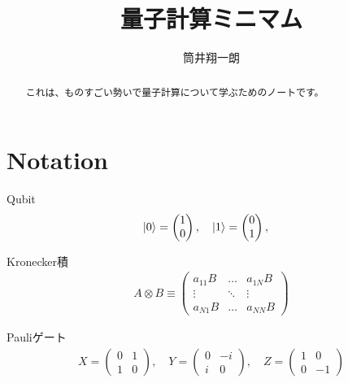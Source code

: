 \documentclass[]{ltjsarticle}
\begin{document}
\title{量子計算ミニマム}


\author{筒井翔一朗}


\maketitle
\begin{abstract}
    これは、ものすごい勢いで量子計算について学ぶためのノートです。
\end{abstract}
\tableofcontents


\section{Notation}
Qubit
\begin{align}
    \ket{0} 
    = 
    \begin{pmatrix}
    1 \\ 0    
    \end{pmatrix}, \quad 
    \ket{1} 
    = 
    \begin{pmatrix}
    0 \\ 1    
    \end{pmatrix}, \quad 
\end{align}

Kronecker積
\begin{align}
    A \otimes B 
    \equiv
    \begin{pmatrix}
        a_{11}B & \dots & a_{1N}B \\
        \vdots & \ddots & \vdots \\
        a_{N1}B & \dots & a_{NN}B
    \end{pmatrix}
\end{align}

Pauliゲート
\begin{align}
    X = 
    \begin{pmatrix}
    0 & 1 \\ 1 & 0     
    \end{pmatrix},\quad 
    Y = 
    \begin{pmatrix}
    0 & -i \\ i & 0     
    \end{pmatrix},\quad 
    Z = 
    \begin{pmatrix}
    1 & 0 \\ 0 & -1     
    \end{pmatrix} 
\end{align}
\end{document}
